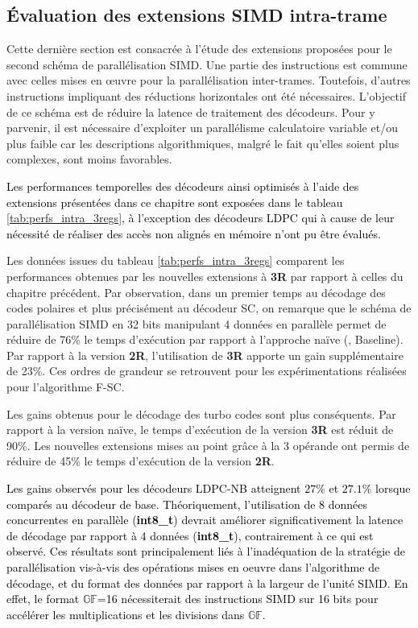 \documentclass[../main.tex]{subfiles}
\begin{document}
\subsection{Évaluation des extensions SIMD intra-trame}
%
%
%
Cette dernière section est consacrée à l'étude des extensions proposées pour le second schéma de parallélisation SIMD. 
Une partie des instructions est commune avec celles mises en œuvre pour la parallélisation inter-trames. 
Toutefois, d'autres instructions impliquant des réductions horizontales ont été nécessaires. L'objectif de ce schéma est de réduire la latence de traitement des décodeurs. 
Pour y parvenir, il est nécessaire d'exploiter un parallélisme calculatoire variable et/ou plus faible car les descriptions algorithmiques, malgré le fait qu'elles soient plus complexes, sont moins favorables.

\textcolor{black}{Les performances temporelles des décodeurs ainsi optimisés à l'aide des extensions présentées dans ce chapitre sont exposées dans le tableau \ref{tab:perfs_intra_3regs}, à l'exception des décodeurs LDPC qui à cause de leur nécessité de réaliser des accès non alignés en mémoire n'ont pu être évalués.}

Les données issues du tableau \ref{tab:perfs_intra_3regs} comparent les performances obtenues par les nouvelles extensions à \textbf{3R} par rapport à celles du chapitre précédent.
Par observation, dans un premier temps au décodage des codes polaires et plus précisément au décodeur SC, on remarque que le schéma de parallélisation SIMD en 32 bits manipulant 4 données en parallèle permet de réduire de 76\% le temps d'exécution par rapport à l'approche naïve (, Baseline).
Par rapport à la version \textbf{2R}, l'utilisation de \textbf{3R} apporte un gain supplémentaire de 23\%.
Ces ordres de grandeur se retrouvent pour les expérimentations réalisées pour l'algorithme F-SC.

Les gains obtenus pour le décodage des turbo codes sont plus conséquents. Par rapport à la version naïve, le temps d'exécution de la version \textbf{3R} est réduit de 90\%.
Les nouvelles extensions mises au point grâce à la 3 opérande ont permis de réduire de 45\% le temps d'exécution de la version \textbf{2R}.

\textcolor{black}{Les gains observés pour les décodeurs LDPC-NB atteignent $27\%$ et $27.1\%$ lorsque comparés au décodeur de base. Théoriquement, l'utilisation de 8 données concurrentes en parallèle (\textbf{int8\_t}) devrait améliorer significativement la latence de décodage par rapport à 4 données (\textbf{int8\_t}), contrairement à ce qui est observé.
Ces résultats sont principalement liés à l'inadéquation de la stratégie de parallélisation vis-à-vis des opérations mises en oeuvre dans l'algorithme de décodage, et du format des données par rapport à la largeur de l'unité SIMD.
En effet, le format $\mathbb{GF}$=16 nécessiterait des instructions SIMD sur 16 bits pour accélérer les multiplications et les divisions dans $\mathbb{GF}$.}
\end{document}
